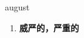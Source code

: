 
\begin{frame}
{\huge august}
\begin{center}
\begin{enumerate}\Large
  \item \textbf{威严的，严重的}
\end{enumerate}
\end{center}
\end{frame}
